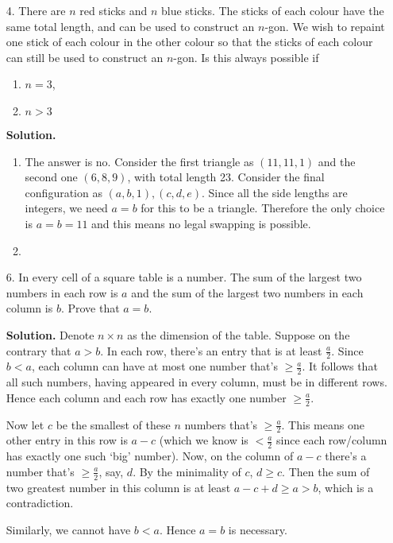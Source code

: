 \documentclass[11pt,a4paper]{article}
\begin{document}
\begin{enumerate}
	
	\item [4.] There are $n$ red sticks and $n$ blue sticks. The sticks of each colour have the same total length, and can be used to construct an $n$-gon. We wish to repaint one stick of each colour in the other colour so that the sticks of each colour can still be used to construct an $n$-gon. Is this always possible if
	\begin{enumerate}
		\item $n = 3$,
		\item $n > 3$
	\end{enumerate}
	\textbf{Solution.} 
	\begin{enumerate}
		\item The answer is no. Consider the first triangle as $(11, 11, 1)$ and the second one $(6, 8, 9)$, with total length 23. Consider the final configuration as $(a, b, 1), (c, d, e)$. Since all the side lengths are integers, we need $a=b$ for this to be a triangle. Therefore the only choice is $a=b=11$ and this means no legal swapping is possible. 
		
		\item 
	\end{enumerate}
	
	\item [6.] In every cell of a square table is a number. The sum of the largest two numbers in each row
	is $a$ and the sum of the largest two numbers in each column is $b$. Prove that $a = b$.
	
	\textbf{Solution.} Denote $n\times n$ as the dimension of the table. Suppose on the contrary that $a>b$. In each row, there's an entry that is at least $\frac{a}{2}$. Since $b<a$, each column can have at most one number that's $\ge \frac{a}{2}$. It follows that all such numbers, having appeared in every column, must be in different rows. Hence each column and each row has exactly one number $\ge\frac{a}{2}$. 
	
	Now let $c$ be the smallest of these $n$ numbers that's $\ge\frac{a}{2}$. This means one other entry in this row is $a-c$ (which we know is $<\frac{a}{2}$ since each row/column has exactly one such `big' number). Now, on the column of $a-c$ there's a number that's $\ge\frac{a}{2}$, say, $d$. By the minimality of $c$, $d\ge c$. Then the sum of two greatest number in this column is at least $a-c+d\ge a>b$, which is a contradiction. 
	
	Similarly, we cannot have $b<a$. Hence $a=b$ is necessary. 
\end{enumerate}
\end{document}
